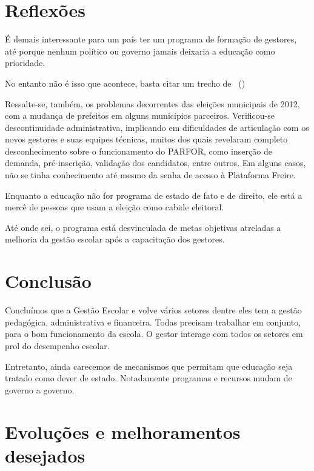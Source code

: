 \documentclass[
	12pt,				%
	openright,			%
	oneside,
	a4paper,			%
	chapter=TITLE,		%
	section=TITLE,		%
	sumario=abnt-6027-2012,
	english,			%
	brazil				%
]{abntex2}
\newcommand{\citeaa}[1]{\citeauthoronline{#1}~(\citeyear{#1})}
\begin{document}
	\section{Reflexões}

		É demais interessante para um país ter um programa de formação de gestores, até porque nenhum político ou governo jamais deixaria a educação como prioridade.
		
		No entanto não é isso que acontece, basta citar um trecho de \citeaa{Glap2017}
		
		\begin{citacao}
			Ressalte-se, também, os problemas decorrentes das eleições municipais de
			2012, com a mudança de prefeitos em alguns municípios parceiros. Verificou-se
			descontinuidade administrativa, implicando em dificuldades de articulação com os
			novos gestores e suas equipes técnicas, muitos dos quais revelaram completo
			desconhecimento sobre o funcionamento do PARFOR, como inserção de demanda,
			pré-inscrição, validação dos candidatos, entre outros. Em alguns casos, não se tinha
			conhecimento até mesmo da senha de acesso à Plataforma Freire.
		\end{citacao}
	
		Enquanto a educação não for programa de estado de fato e de direito, ele está a mercê de pessoas que usam a eleição como cabide eleitoral.
		
		Até onde sei, o programa está desvinculada de metas objetivas atreladas a melhoria da gestão escolar após a capacitação dos gestores. 
		

	\section{Conclusão}		
		Concluímos  que  a  Gestão  Escolar  e volve  vários  setores  dentre  eles  tem  a  gestão pedagógica,  administrativa  e  financeira. Todas  precisam  trabalhar  em  conjunto,  para o  bom  funcionamento  da  escola.  O  gestor  interage  com  todos  os setores  em  prol  do desempenho escolar.
		
		Entretanto, ainda carecemos de mecanismos que permitam que educação seja tratado como dever de estado. Notadamente programas e recursos mudam de governo a governo.

	\section{Evoluções e melhoramentos desejados}
	
\end{document}
